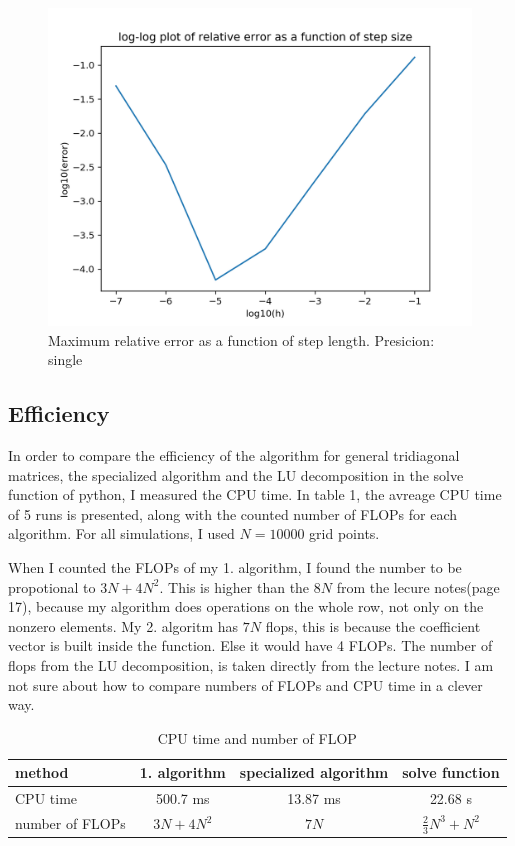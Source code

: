 \documentclass{article}
\begin{document}
\begin{figure}
  \includegraphics[width=\linewidth]{errorfigsinglefloat.png}
  \caption{Maximum relative error as a function of step length. Presicion: single}
  \label{fig:1000 grid points}
\end{figure}

\subsection{Efficiency}
In order to compare the efficiency of the algorithm for general tridiagonal matrices, the specialized algorithm and the LU decomposition in the solve function of python, I measured the CPU time. In table 1, the avreage CPU time of 5 runs is presented, along with the counted number of FLOPs for each algorithm. For all simulations, I used $N=10000$ grid points. 

When I counted the FLOPs of my 1. algorithm, I found the number to be propotional to $3N+4N^2$. This is higher than the $8N$ from the lecure notes(page 17), because my algorithm does operations on the whole row, not only on the nonzero elements. My 2. algoritm has $7N$ flops, this is because the coefficient vector is built inside the function. Else it would have 4 FLOPs. The number of flops from the LU decomposition, is taken directly from the lecture notes. I am not sure about how to compare numbers of FLOPs and CPU time in a clever way.
\begin{table}[h!]
  \centering
  \caption{CPU time and number of FLOP}
  \label{tab:table1}
  \begin{tabular}{l||c|c|c}
    method & 1. algorithm & specialized algorithm & solve function\\
    \hline
    CPU time & 500.7 ms & 13.87 ms & 22.68 s\\
    \hline
    number of FLOPs & $3N+4N^2$ & $7N$ & $\frac{2}{3}N^{3}+N^2$\\
  \end{tabular}
\end{table}
\end{document}
